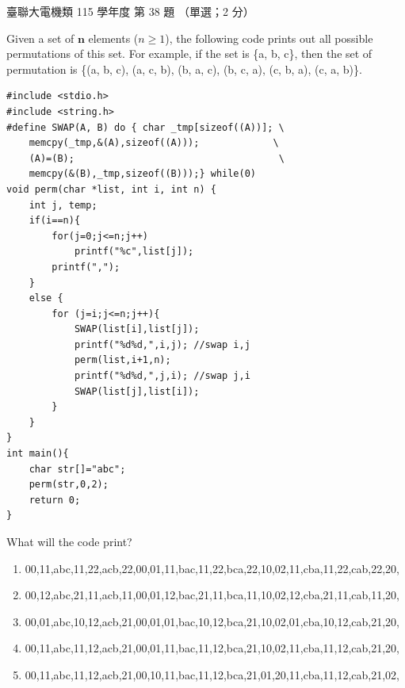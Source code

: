 \begin{pastexam}[label={px:ust-115-ee-ds-38}]{臺聯大電機類 115 學年度 第 38 題}
（單選；2 分）

Given a set of $\boldsymbol{n}$ elements ($n\ge 1$), the following code prints out all possible
permutations of this set. For example, if the set is \{a, b, c\}, then the set of permutation is
\{(a, b, c), (a, c, b), (b, a, c), (b, c, a), (c, b, a), (c, a, b)\}.
\begin{verbatim}
#include <stdio.h>
#include <string.h>
#define SWAP(A, B) do { char _tmp[sizeof((A))]; \
    memcpy(_tmp,&(A),sizeof((A)));             \
    (A)=(B);                                    \
    memcpy(&(B),_tmp,sizeof((B)));} while(0)
void perm(char *list, int i, int n) {
    int j, temp;
    if(i==n){
        for(j=0;j<=n;j++)
            printf("%c",list[j]);
        printf(",");
    }
    else {
        for (j=i;j<=n;j++){
            SWAP(list[i],list[j]);
            printf("%d%d,",i,j); //swap i,j
            perm(list,i+1,n);
            printf("%d%d,",j,i); //swap j,i
            SWAP(list[j],list[i]);
        }
    }
}
int main(){
    char str[]="abc";
    perm(str,0,2);
    return 0;
}
\end{verbatim}
What will the code print?
{\footnotesize\ttfamily
\begin{enumerate}[label=(\Alph*)]
\item 00,11,abc,11,22,acb,22,00,01,11,bac,11,22,bca,22,10,02,11,cba,11,22,cab,22,20,
\item 00,12,abc,21,11,acb,11,00,01,12,bac,21,11,bca,11,10,02,12,cba,21,11,cab,11,20,
\item 00,01,abc,10,12,acb,21,00,01,01,bac,10,12,bca,21,10,02,01,cba,10,12,cab,21,20,
\item 00,11,abc,11,12,acb,21,00,01,11,bac,11,12,bca,21,10,02,11,cba,11,12,cab,21,20,
\item 00,11,abc,11,12,acb,21,00,10,11,bac,11,12,bca,21,01,20,11,cba,11,12,cab,21,02,
\end{enumerate}}
\end{pastexam}

